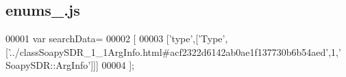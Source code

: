 \subsection{enums\+\_.\+js}
\label{enums__2_8js_source}

\begin{DoxyCode}
00001 var searchData=
00002 [
00003   [\textcolor{stringliteral}{'type'},[\textcolor{stringliteral}{'Type'},[\textcolor{stringliteral}{'../classSoapySDR\_1\_1ArgInfo.html#acf2322d6142ab0ae1f137730b6b54aed'},1,\textcolor{stringliteral}{'
      SoapySDR::ArgInfo'}]]]
00004 ];
\end{DoxyCode}
